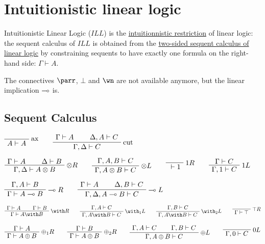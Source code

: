 \section{Intuitionistic linear logic}\label{intuitionistic-linear-logic}

Intuitionistic Linear Logic (\(ILL\)) is the
\href{intuitionnistic_restriction}{intuitionnistic restriction} of
linear logic: the sequent calculus of \(ILL\) is obtained from the
\href{Sequent_calculus\#Sequents_and_proofs}{two-sided sequent calculus
of linear logic} by constraining sequents to have exactly one formula on
the right-hand side: \(\Gamma\vdash A\).

The connectives \(\parr\), \(\bot\) and \(\wn\) are not available
anymore, but the linear implication \(\multimap\) is.

\subsection{Sequent Calculus}\label{sequent-calculus}

\(\LabelRule{\rulename{ax}}
\NulRule{A\vdash A}
\DisplayProof
\qquad
\AxRule{\Gamma\vdash A}
\AxRule{\Delta,A\vdash C}
\LabelRule{\rulename{cut}}
\BinRule{\Gamma,\Delta\vdash C}
\DisplayProof\)

\(\AxRule{\Gamma\vdash A}
\AxRule{\Delta\vdash B}
\LabelRule{\tens R}
\BinRule{\Gamma,\Delta\vdash A\tens B}
\DisplayProof
\qquad
\AxRule{\Gamma,A,B\vdash C}
\LabelRule{\tens L}
\UnaRule{\Gamma,A\tens B\vdash C}
\DisplayProof
\qquad
\LabelRule{\one R}
\NulRule{{}\vdash\one}
\DisplayProof
\qquad
\AxRule{\Gamma\vdash C}
\LabelRule{\one L}
\UnaRule{\Gamma,\one\vdash C}
\DisplayProof\)

\(\AxRule{\Gamma,A\vdash B}
\LabelRule{\limp R}
\UnaRule{\Gamma\vdash A\limp B}
\DisplayProof
\qquad
\AxRule{\Gamma\vdash A}
\AxRule{\Delta,B\vdash C}
\LabelRule{\limp L}
\BinRule{\Gamma,\Delta,A\limp B\vdash C}
\DisplayProof\)

\(\AxRule{\Gamma\vdash A}
\AxRule{\Gamma\vdash B}
\LabelRule{\with R}
\BinRule{\Gamma\vdash A\with B}
\DisplayProof
\qquad
\AxRule{\Gamma,A\vdash C}
\LabelRule{\with_1 L}
\UnaRule{\Gamma,A\with B\vdash C}
\DisplayProof
\qquad
\AxRule{\Gamma,B\vdash C}
\LabelRule{\with_2 L}
\UnaRule{\Gamma,A\with B\vdash C}
\DisplayProof
\qquad
\LabelRule{\top R}
\NulRule{\Gamma\vdash\top}
\DisplayProof\)

\(\AxRule{\Gamma\vdash A}
\LabelRule{\plus_1 R}
\UnaRule{\Gamma\vdash A\plus B}
\DisplayProof
\qquad
\AxRule{\Gamma\vdash B}
\LabelRule{\plus_2 R}
\UnaRule{\Gamma\vdash A\plus B}
\DisplayProof
\qquad
\AxRule{\Gamma,A\vdash C}
\AxRule{\Gamma,B\vdash C}
\LabelRule{\plus L}
\BinRule{\Gamma,A\plus B\vdash C}
\DisplayProof
\qquad
\LabelRule{\zero L}
\NulRule{\Gamma,\zero\vdash C}
\DisplayProof\)

